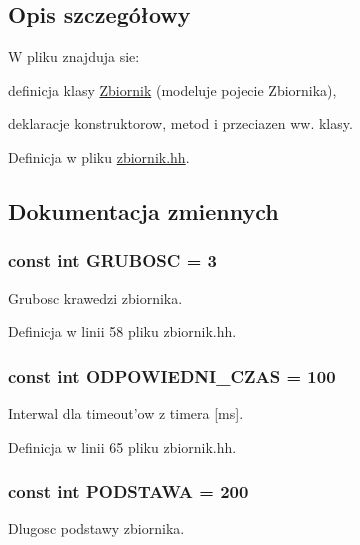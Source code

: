 \subsection{Opis szczegółowy}
W pliku znajduja sie\-:
\begin{DoxyItemize}
\item definicja klasy \hyperlink{class_zbiornik}{Zbiornik} (modeluje pojecie Zbiornika),
\item deklaracje konstruktorow, metod i przeciazen ww. klasy. 
\end{DoxyItemize}

Definicja w pliku \hyperlink{zbiornik_8hh_source}{zbiornik.\-hh}.



\subsection{Dokumentacja zmiennych}
\hypertarget{zbiornik_8hh_a359a95636f17b8e9b7a01389d75b521d}{
\subsubsection[{G\-R\-U\-B\-O\-S\-C}]{\setlength{\rightskip}{0pt plus 5cm}const int G\-R\-U\-B\-O\-S\-C = 3}}\label{zbiornik_8hh_a359a95636f17b8e9b7a01389d75b521d}
Grubosc krawedzi zbiornika. 

Definicja w linii 58 pliku zbiornik.\-hh.

\hypertarget{zbiornik_8hh_a3a09b0fc9bed85242f7783147af182ae}{
\subsubsection[{O\-D\-P\-O\-W\-I\-E\-D\-N\-I\-\_\-\-C\-Z\-A\-S}]{\setlength{\rightskip}{0pt plus 5cm}const int O\-D\-P\-O\-W\-I\-E\-D\-N\-I\-\_\-\-C\-Z\-A\-S = 100}}\label{zbiornik_8hh_a3a09b0fc9bed85242f7783147af182ae}
Interwal dla timeout'ow z timera \mbox{[}ms\mbox{]}. 

Definicja w linii 65 pliku zbiornik.\-hh.

\hypertarget{zbiornik_8hh_acd3c5814c051e565bf7854f6403acf49}{
\subsubsection[{P\-O\-D\-S\-T\-A\-W\-A}]{\setlength{\rightskip}{0pt plus 5cm}const int P\-O\-D\-S\-T\-A\-W\-A = 200}}\label{zbiornik_8hh_acd3c5814c051e565bf7854f6403acf49}
Dlugosc podstawy zbiornika. 

